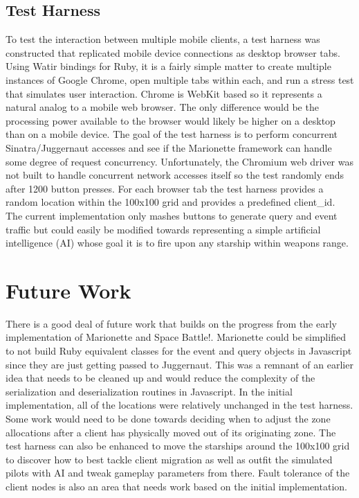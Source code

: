 \documentclass[12pt]{report}	%
\theoremstyle{definition}
\theoremstyle{remark}
\begin{document}
\section{Test Harness}

To test the interaction between multiple mobile clients, a test harness
was constructed that replicated mobile device connections as desktop
browser tabs. Using Watir bindings for Ruby, it is a fairly simple
matter to create multiple instances of Google Chrome, open multiple tabs
within each, and run a stress test that simulates user interaction.
Chrome is WebKit based so it represents a natural analog to a mobile web
browser. The only difference would be the processing power available to
the browser would likely be higher on a desktop than on a mobile device.
The goal of the test harness is to perform concurrent Sinatra/Juggernaut
accesses and see if the Marionette framework can handle some degree of
request concurrency. Unfortunately, the Chromium web driver was not
built to handle concurrent network accesses itself so the test randomly
ends after 1200 button presses. For each browser tab
the test harness provides a random location within the 100x100 grid and
provides a predefined client\_id. The current implementation only mashes
buttons to generate query and event traffic but could easily be modified
towards representing a simple artificial intelligence (AI) whose goal it
is to fire upon any starship within weapons range.

\chapter{Future Work}

There is a good deal of future work that builds on the progress from the
early implementation of Marionette and Space Battle!. Marionette could
be simplified to not build Ruby equivalent classes for the event and
query objects in Javascript since they are just getting passed to
Juggernaut. This was a remnant of an earlier idea that needs to be
cleaned up and would reduce the complexity of the serialization and
deserialization routines in Javascript. In the initial implementation,
all of the locations were relatively unchanged in the test harness. Some
work would need to be done towards deciding when to adjust the zone
allocations after a client has physically moved out of its originating
zone. The test harness can also be enhanced to move the starships around
the 100x100 grid to discover how to best tackle client migration as well
as outfit the simulated pilots with AI and tweak gameplay parameters
from there. Fault tolerance of the client nodes is also an area that
needs work based on the initial implementation.
\end{document}
